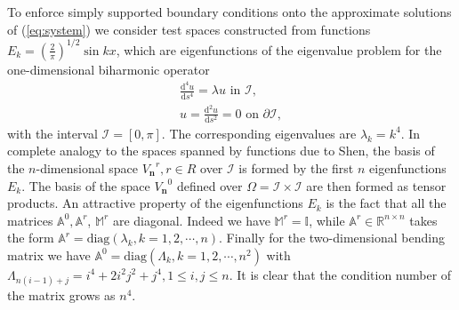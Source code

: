 \documentclass{marine_2015}
\newcommand{\Vh}{\ensuremath{V_{\mathbf{n}}}}
\newcommand{\deriv}[2]{\ensuremath{\frac{\mathrm{d}#1}{\mathrm{d}#2}}}
\begin{document}
To enforce simply supported boundary conditions onto the approximate solutions of
(\ref{eq:system}) we consider test spaces constructed from functions 
$E_k=\left(\tfrac{2}{\pi}\right)^{1/2}\sin{kx}$,
which are eigenfunctions of the eigenvalue problem for the one-dimensional biharmonic 
operator
\[
  \begin{aligned}
  \deriv{^4 u}{s^4} = \lambda u\text{ in }\mathcal{I},\\
  u = \deriv{^2 u}{s^2} = 0\text{ on }\partial\mathcal{I},
  \end{aligned}
\]
with the interval $\mathcal{I}=\left[0, \pi\right]$. The corresponding
eigenvalues are $\lambda_k=k^4$. In complete analogy to the spaces spanned by
functions due to Shen, the basis of the $n$-dimensional space $\Vh^r, r\in R$ over
$\mathcal{I}$ is formed by the first $n$ eigenfunctions $E_k$. The basis of the
space $\Vh^0$ defined over $\Omega=\mathcal{I}\times\mathcal{I}$ are then formed
as tensor products. An attractive property of the eigenfunctions $E_k$ is the fact
that all the matrices $\mathbb{A}^0, \mathbb{A}^r$, $\mathbb{M}^r$ are diagonal. Indeed we
have $\mathbb{M}^r=\mathbb{I}$, while $\mathbb{A}^r\in\mathbb{R}^{n \times n}$ 
takes the form $\mathbb{A}^r=\text{diag}\left(\lambda_k, k=1, 2, \cdots,
n\right)$. Finally for the two-dimensional bending matrix we have 
$\mathbb{A}^0=\text{diag}\left(\Lambda_{k}, k=1, 2, \cdots, n^2\right)$
with $\Lambda_{n(i-1)+j}= i^4 + 2 i^2 j^2 + j^4, 1\leq i, j \leq n$.
It is clear that the condition number of the matrix grows as $n^4$. 
\end{document}
